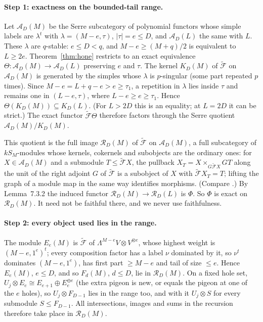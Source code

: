 \paragraph{Step 1: exactness on the bounded-tail range.}  Let $\mathcal A_D(M)$ be the Serre
subcategory of polynomial functors whose simple labels are $\lambda^t$ with
$\lambda=(M-e,\tau)$, $|\tau|=e\le D$, and $\mathcal A_D(L)$ the same with $L$.  These
$\lambda$ are $q$-stable: $e\le D<q$, and $M-e\ge(M+q)/2$ is equivalent to $L\ge2e$.
Theorem~\ref{thm:hone} restricts to an exact equivalence
$\Theta\colon\mathcal A_D(M)\to\mathcal A_D(L)$ preserving $e$ and $\tau$.  The kernel
$K_D(M)$ of $\tilde{\mathcal F}$ on $\mathcal A_D(M)$ is generated by the simples whose
$\lambda$ is $p$-singular (some part repeated $p$ times).  Since
$M-e=L+q-e>e\ge\tau_1$, a repetition in $\lambda$ lies inside $\tau$ and remains one in
$(L-e,\tau)$, where $L-e\ge e\ge\tau_1$.  Hence $\Theta(K_D(M))\subseteq K_D(L)$.  (For
$L>2D$ this is an equality; at $L=2D$ it can be strict.)  The exact functor
$\tilde{\mathcal F}\Theta$ therefore factors through the Serre quotient
$\mathcal A_D(M)/K_D(M)$.

This quotient is the full image $\mathcal R_D(M)$ of $\tilde{\mathcal F}$ on
$\mathcal A_D(M)$, a full subcategory of $kS_M$-modules whose kernels, cokernels and
subobjects are the ordinary ones: for $X\in\mathcal A_D(M)$ and a submodule
$T\le\tilde{\mathcal F}X$, the pullback $X_T=X\times_{G\tilde{\mathcal F}X}GT$ along the
unit of the right adjoint $G$ of $\tilde{\mathcal F}$ is a subobject of $X$ with
$\tilde{\mathcal F}X_T=T$; lifting the graph of a module map in the same way identifies
morphisms.  (Compare \cite[Lemma~8.5.1]{hone2025}.)  By Lemma~7.3.2 the induced functor
$\mathcal R_D(M)\to\mathcal R_D(L)$ is $\Phi$.  So $\Phi$ is exact on $\mathcal R_D(M)$.  It
need not be faithful there, and we never use faithfulness.

\paragraph{Step 2: every object used lies in the range.}  The module $E_e(M)$ is
$\tilde{\mathcal F}$ of $\Lambda^{M-e}V\otimes V^{\otimes e}$, whose highest weight is
$(M-e,1^e)^t$; every composition factor has a label $\nu$ dominated by it, so $\nu^t$
dominates $(M-e,1^e)$, has first part $\ge M-e$ and tail of size $\le e$.  Hence $E_e(M)$,
$e\le D$, and so $F_d(M)$, $d\le D$, lie in $\mathcal R_D(M)$.  On a fixed hole set,
$U_j\otimes E_e\cong E_{e+1}\oplus E_e^{\oplus e}$ (the extra pigeon is new, or equals the
pigeon at one of the $e$ holes), so $U_j\otimes F_{D-1}$ lies in the range too, and with it
$U_j\otimes S$ for every submodule $S\le F_{D-1}$.  All intersections, images and sums in the
recursion therefore take place in $\mathcal R_D(M)$.


